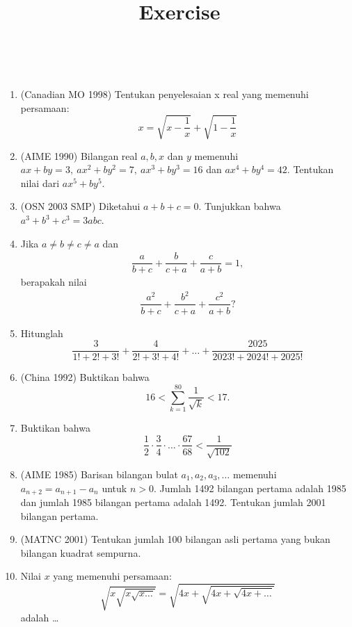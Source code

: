 \documentclass[12pt]{scrartcl}
\title{Exercise}
\begin{document}
\renewcommand*\contentsname{Daftar Isi}
\tableofcontents

\newpage
{}\\

\begin{enumerate}
    \item (Canadian MO 1998) Tentukan penyelesaian x real yang memenuhi persamaan:
    \[ x = \sqrt{x-\dfrac{1}{x}} + \sqrt{1-\dfrac{1}{x}} \]

    \item (AIME 1990) Bilangan real $a, b, x$ dan $y$ memenuhi $ax+by=3, \ ax^2+by^2=7, \ ax^3+by^3=16$ dan $ax^4+by^4=42$. Tentukan nilai dari $ax^5+by^5$.

    \item (OSN 2003 SMP) Diketahui $a+b+c=0$. Tunjukkan bahwa $a^3+b^3+c^3=3abc$.

    \item Jika $a \neq b \neq c \neq a$ dan
    \begin{align*}
        \dfrac{a}{b+c}+\dfrac{b}{c+a}+\dfrac{c}{a+b} = 1,
    \end{align*}
	berapakah nilai
    \begin{align*}
        \dfrac{a^2}{b+c}+\dfrac{b^2}{c+a}+\dfrac{c^2}{a+b}?
    \end{align*}


    \item Hitunglah
    \[ \frac{3}{1! + 2! + 3!} + \frac{4}{2! + 3! + 4!} + \dots + \frac{2025}{2023! + 2024! + 2025!} \]

    \item (China 1992) Buktikan bahwa
    \[ 16 < \sum_{k=1}^{80} \frac{1}{\sqrt{k}} < 17. \]

    \item Buktikan bahwa
    \[ \frac{1}{2} \cdot \frac{3}{4} \cdot \ldots \cdot\frac{67}{68} < \frac{1}{\sqrt{102}}\]

    \item (AIME 1985) Barisan bilangan bulat $a_1, a_2, a_3, \dots$ memenuhi $a_{n+2} = a_{n+1} - a_n$ untuk $n > 0$. Jumlah 1492 bilangan pertama adalah 1985 dan jumlah 1985 bilangan pertama adalah 1492. Tentukan jumlah 2001 bilangan pertama.

        
    \item (MATNC 2001) Tentukan jumlah 100 bilangan asli pertama yang bukan bilangan kuadrat sempurna.
    \item Nilai $x$ yang memenuhi persamaan:
    \[ \sqrt{x\sqrt{x\sqrt{x\dots}}} = \sqrt{4x+\sqrt{4x+\sqrt{4x+\dots}}} \]
    adalah \dots
    

\end{enumerate}
\end{document}
